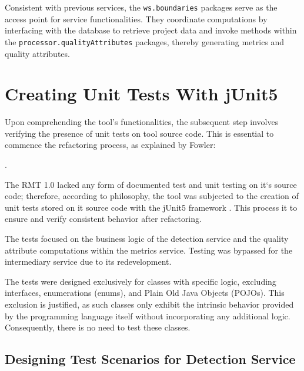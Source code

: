 Consistent with previous services, the \texttt{ws.boundaries} packages serve as the access point for service functionalities. They coordinate computations by interfacing with the database to retrieve project data and invoke methods within the \texttt{processor.qualityAttributes} packages, thereby generating metrics and quality attributes.
 
\section{Creating Unit Tests With jUnit5}
\label{sec-creating-tests}

Upon comprehending the tool's functionalities, the subsequent step involves verifying the presence of unit tests on tool source code. This is essential to commence the refactoring process, as explained by Fowler:

.

The RMT 1.0 lacked any form of documented test and unit testing on it`s source code; therefore, according to \textcite{fowler2018refactoring} philosophy, the tool was subjected to the creation of unit tests stored on it source code with the jUnit5 framework \cite{junit}. This process it to ensure and verify consistent behavior after refactoring. 

The tests focused on the business logic of the detection service and the quality attribute computations within the metrics service. Testing was bypassed for the intermediary service due to its redevelopment.

The tests were designed exclusively for classes with specific logic, excluding interfaces, enumerations (enums), and Plain Old Java Objects (POJOs). This exclusion is justified, as such classes only exhibit the intrinsic behavior provided by the programming language itself without incorporating any additional logic. Consequently, there is no need to test these classes.

\subsection{Designing Test Scenarios for Detection Service}
\label{detection-design-tests}

